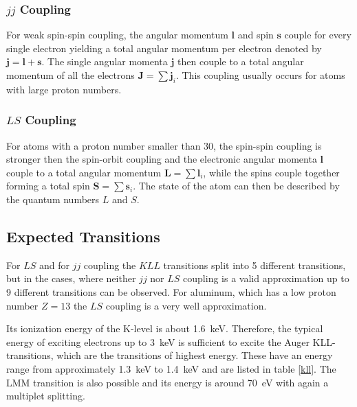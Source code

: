 \documentclass[a4paper]{scrartcl}
\numberwithin{equation}{section}
\numberwithin{figure}{section}
\numberwithin{table}{section}
\newcommand{\ve}[1]{\mathbf{ #1} }
\begin{document}
\subsubsection*{$jj$ Coupling}
For weak spin-spin coupling, the angular momentum $\ve l$ and spin $\ve s$ couple for every single electron yielding a total angular momentum per electron denoted by $\ve j = \ve l + \ve s$. The single angular momenta $\ve j$ then couple to a total angular momentum of all the electrons $\ve J=\sum \ve j_i$. This coupling usually occurs for atoms with large proton numbers.
\subsubsection*{$LS$ Coupling}
For atoms with a proton number smaller than 30, the spin-spin coupling is stronger then the spin-orbit coupling and the electronic angular momenta $\ve l$ couple to a total angular momentum $\ve L =\sum \ve l_i$, while the spins couple together forming a total spin $\ve S = \sum \ve s_i$. The state of the atom can then be described by the quantum numbers $L$ and $S$.


\subsection{Expected Transitions}
For $LS$ and for $jj$ coupling the $KLL$ transitions split into 5 different transitions, but in the cases, where neither $jj$ nor $LS$ coupling is a valid approximation up to 9 different transitions can be observed. For aluminum, which has a low proton number $Z=13$ the $LS$ coupling is a very well approximation.


Its ionization energy of the K-level is about \SI{1,6}{keV}. Therefore, the typical energy of exciting electrons up to \SI{3}{keV} is sufficient to excite the Auger KLL-transitions, which are the transitions of highest energy. These have an energy range from approximately \SI{1,3}{keV} to \SI{1,4}{keV} and are listed in table \ref{kll}. The LMM transition is also possible and its energy is around \SI{70}{eV} with again a multiplet splitting.

%
\end{document}
